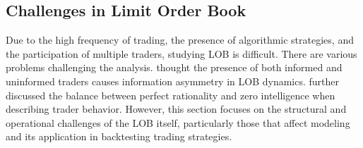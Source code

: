 \subsection{Challenges in Limit Order Book}
Due to the high frequency of trading, the presence of algorithmic strategies, and the participation of multiple traders, studying LOB is difficult. There are various problems challenging the analysis. \cite{drame2020limitorderbooklob} thought the presence of both informed and uninformed traders causes information asymmetry in LOB dynamics. \cite{gould_limit_2013} further discussed the balance between perfect rationality and zero intelligence when describing trader behavior. However, this section focuses on the structural and operational challenges of the LOB itself, particularly those that affect modeling and its application in backtesting trading strategies.
